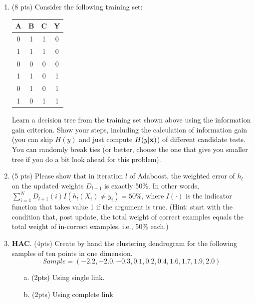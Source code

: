 \documentclass{article}
\def\x{{\bf x}}
\begin{document}
\begin{enumerate}
\begin{enumerate}

\end{enumerate}
\item (8 pts) Consider the following training set:

\begin{center}
\begin{tabular}{|c|c|c|c|}\hline
A&B&C&Y\\ \hline
0&1&1&0 \\ \hline
1&1&1&0 \\ \hline
0&0&0&0 \\ \hline
1&1&0&1 \\ \hline
0&1&0&1 \\ \hline
1&0&1&1 \\ \hline
\end{tabular}
\end{center}

Learn a decision tree from the training set shown above using the information gain criterion. Show your steps, including the calculation of information gain (you can skip $H(y)$ and just compute $H(y|\x)$) of different candidate tests. You can randomly break ties (or better, choose the one that give you smaller tree if you do a bit look ahead for this problem).


\item (5 pts) Please show that in iteration $l$ of Adaboost, the weighted error of $h_l$ on the updated weights $D_{l+1}$ is exactly 50\%. In other words, $\sum_{i=1}^N D_{l+1}(i) I(h_l(X_i)\neq y_i) = 50\%$, where $I(\cdot)$ is the indicator function that takes value 1 if the argument is true. (Hint: start with the condition that, post update, the total weight of correct examples equals the total weight of in-correct examples, i.e., 50\% each.)


\item {\bf HAC}. (4pts) Create by hand the clustering dendrogram for the following samples of ten points in one dimension.
\[Sample=( - 2.2, -2.0, -0.3, 0.1, 0.2, 0.4, 1.6, 1.7, 1.9, 2.0)\]
\begin{itemize}
\item[a.] (2pts) Using single link.\\

\item[b.] (2pts) Using complete link \\


\end{itemize}
\end{enumerate}
\end{document}
